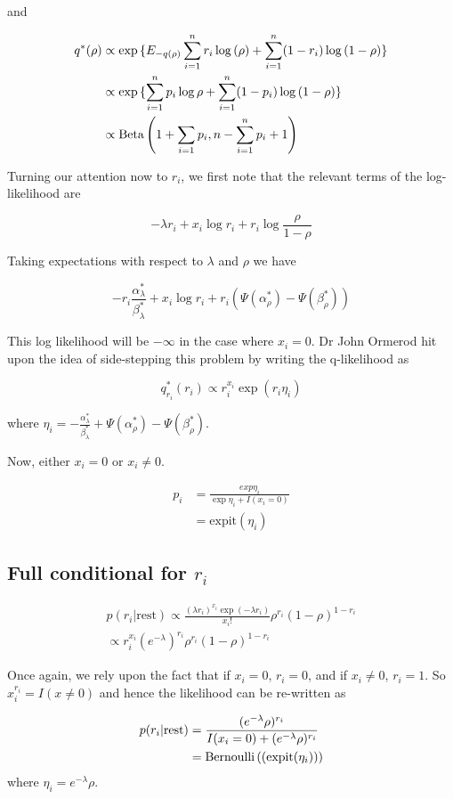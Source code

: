 \documentclass{amsart}
\begin{document}
and

\begin{align*}
q^*(\rho) &\propto \exp{\{ E_{-q(\rho)} \sum_{i=1}^n r_i \log{(\rho)} + \sum_{i=1}^n (1- r_i) \log{(1 - \rho)} \}} \\
&\propto \exp{\{ \sum_{i=1}^n p_i \log{\rho} + \sum_{i=1}^n (1 - p_i) \log{(1 - \rho)} \}} \\
&\propto \text{Beta} \left( 1+ \sum_{i=1} p_i, n - \sum_{i=1}^n p_i + 1 \right)
\end{align*}

Turning our attention now to $r_i$, we first note that the relevant terms of the
log-likelihood are

$$
-\lambda r_i + x_i \log{r_i} + r_i \log{\frac{\rho}{1 - \rho}}
$$

Taking expectations with respect to $\lambda$ and $\rho$ we have

$$
-r_i \frac{\alpha_\lambda^*}{\beta_\lambda^*} + x_i \log{r_i} + r_i (\Psi(\alpha_\rho^*) - \Psi(\beta_\rho^*))
$$

This log likelihood will be $-\infty$ in the case where $x_i = 0$. Dr John Ormerod hit
upon the idea of side-stepping this problem by writing the q-likelihood as

$$
q_{r_i}^*(r_i) \propto r_i^{x_i} \exp{(r_i \eta_i)}
$$

where $\eta_i = - \frac{\alpha_\lambda^*}{\beta_\lambda^*} + \Psi(\alpha_\rho^*) - \Psi(\beta_\rho^*)$.

Now, either $x_i = 0$ or $x_i \ne 0$.

\begin{align*}
p_i &= \frac{exp{\eta_i}}{\exp{\eta_i} + I(x_i = 0)} \\
&= \text{expit}(\eta_i)
\end{align*}

\subsection{Full conditional for $r_i$}
\begin{align*}
p(r_i | \text{rest}) \propto \frac{(\lambda r_i)^{x_i} \exp{(-\lambda r_i)}}{x_i !} \rho^{r_i} (1 - \rho)^{1 - r_i} \\
\propto r_i^{x_i} (e^{-\lambda})^{r_i} \rho^{r_i} (1 - \rho)^{1 - r_i}
\end{align*}

Once again, we rely upon the fact that if $x_i = 0$, $r_i = 0$, and if $x_i \ne 0$,
$r_i = 1$. So $x_i^{r_i} = I(x \ne 0)$ and hence the likelihood can be re-written as

\begin{align*}
p(r_i | \text{rest}) &= \frac{(e^{-\lambda} \rho)^{r_i}}{I(x_i = 0) + (e^{-\lambda} \rho)^{r_i}} \\
&= \text{Bernoulli} \left( (\text{expit}(\eta_i)) \right)
\end{align*}
where $\eta_i = e^{-\lambda} \rho$.
\end{document}
